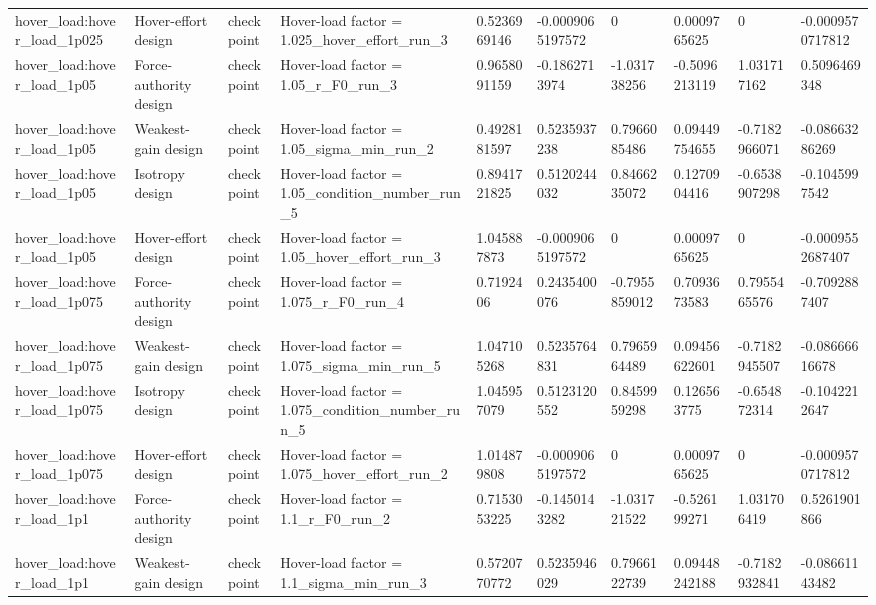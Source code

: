 \begin{tabular}{@{}llllllllll@{}}
hover\_load:hover\_load\_1p025 & Hover-effort design & checkpoint & Hover-load factor = 1.025\_hover\_effort\_run\_3 & 0.5236969146 & -0.0009065197572 & 0 & 0.0009765625 & 0 & -0.0009570717812 \\
hover\_load:hover\_load\_1p05 & Force-authority design & checkpoint & Hover-load factor = 1.05\_r\_F0\_run\_3 & 0.9658091159 & -0.1862713974 & -1.031738256 & -0.5096213119 & 1.031717162 & 0.5096469348 \\
hover\_load:hover\_load\_1p05 & Weakest-gain design & checkpoint & Hover-load factor = 1.05\_sigma\_min\_run\_2 & 0.4928181597 & 0.5235937238 & 0.7966085486 & 0.09449754655 & -0.7182966071 & -0.08663286269 \\
hover\_load:hover\_load\_1p05 & Isotropy design & checkpoint & Hover-load factor = 1.05\_condition\_number\_run\_5 & 0.8941721825 & 0.5120244032 & 0.8466235072 & 0.1270904416 & -0.6538907298 & -0.1045997542 \\
hover\_load:hover\_load\_1p05 & Hover-effort design & checkpoint & Hover-load factor = 1.05\_hover\_effort\_run\_3 & 1.045887873 & -0.0009065197572 & 0 & 0.0009765625 & 0 & -0.0009552687407 \\
hover\_load:hover\_load\_1p075 & Force-authority design & checkpoint & Hover-load factor = 1.075\_r\_F0\_run\_4 & 0.7192406 & 0.2435400076 & -0.7955859012 & 0.7093673583 & 0.7955465576 & -0.7092887407 \\
hover\_load:hover\_load\_1p075 & Weakest-gain design & checkpoint & Hover-load factor = 1.075\_sigma\_min\_run\_5 & 1.047105268 & 0.5235764831 & 0.7965964489 & 0.09456622601 & -0.7182945507 & -0.08666616678 \\
hover\_load:hover\_load\_1p075 & Isotropy design & checkpoint & Hover-load factor = 1.075\_condition\_number\_run\_5 & 1.045957079 & 0.5123120552 & 0.8459959298 & 0.126563775 & -0.654872314 & -0.1042212647 \\
hover\_load:hover\_load\_1p075 & Hover-effort design & checkpoint & Hover-load factor = 1.075\_hover\_effort\_run\_2 & 1.014879808 & -0.0009065197572 & 0 & 0.0009765625 & 0 & -0.0009570717812 \\
hover\_load:hover\_load\_1p1 & Force-authority design & checkpoint & Hover-load factor = 1.1\_r\_F0\_run\_2 & 0.7153053225 & -0.1450143282 & -1.031721522 & -0.526199271 & 1.031706419 & 0.5261901866 \\
hover\_load:hover\_load\_1p1 & Weakest-gain design & checkpoint & Hover-load factor = 1.1\_sigma\_min\_run\_3 & 0.5720770772 & 0.5235946029 & 0.7966122739 & 0.09448242188 & -0.7182932841 & -0.08661143482 \\

\end{tabular}
